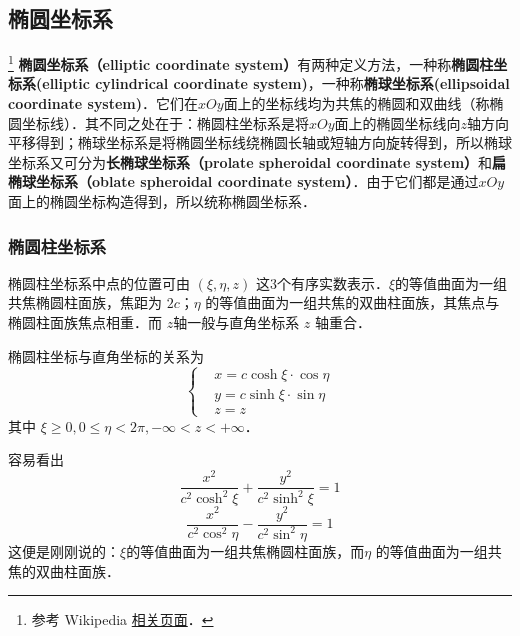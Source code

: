 
\begin{issues}
\issueDraft
\end{issues}


\subsection{椭圆坐标系}
\footnote{参考 Wikipedia \href{https://en.wikipedia.org/wiki/Elliptic_coordinate_system}{相关页面}．}
\textbf{椭圆坐标系（elliptic coordinate system）}有两种定义方法，一种称\textbf{椭圆柱坐标系(elliptic cylindrical coordinate system)}，一种称\textbf{椭球坐标系(ellipsoidal coordinate system)}．它们在$xOy$面上的坐标线均为共焦的椭圆和双曲线（称椭圆坐标线）．其不同之处在于：椭圆柱坐标系是将$xOy$面上的椭圆坐标线向$z$轴方向平移得到；椭球坐标系是将椭圆坐标线绕椭圆长轴或短轴方向旋转得到，所以椭球坐标系又可分为\textbf{长椭球坐标系（prolate spheroidal coordinate system）}和\textbf{扁椭球坐标系（oblate spheroidal coordinate system）}．由于它们都是通过$xOy$面上的椭圆坐标构造得到，所以统称椭圆坐标系．
\subsubsection{椭圆柱坐标系}
椭圆柱坐标系中点的位置可由 $(\xi,\eta,z)$ 这3个有序实数表示．$\xi$的等值曲面为一组共焦椭圆柱面族，焦距为 $2c$；$\eta$ 的等值曲面为一组共焦的双曲柱面族，其焦点与椭圆柱面族焦点相重．而 $z$轴一般与直角坐标系 $z$ 轴重合．

椭圆柱坐标与直角坐标的关系为
\begin{equation}\label{EliCor_eq1}
\left\{\begin{aligned}
&x=c\cosh\xi\cdot\cos\eta\\
&y=c\sinh\xi\cdot\sin\eta\\
&z=z
\end{aligned}\right.
\end{equation}
其中 $\xi\geq0,0\leq\eta<2\pi,-\infty<z<+\infty$．

容易看出
\begin{equation}
\frac{x^2}{c^2\cosh^2\xi}+\frac{y^2}{c^2\sinh^2\xi}=1
\end{equation}
\begin{equation}
\frac{x^2}{c^2\cos^2\eta}-\frac{y^2}{c^2\sin^2\eta}=1
\end{equation}
这便是刚刚说的：$\xi$的等值曲面为一组共焦椭圆柱面族，而$\eta$ 的等值曲面为一组共焦的双曲柱面族．
